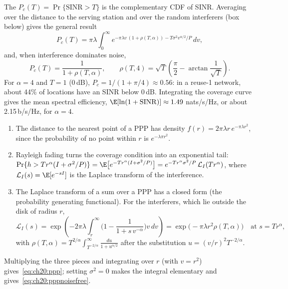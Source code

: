 The  $P_c(T)=\Pr\{\mathrm{SINR}>T\}$ is the complementary CDF of SINR. Averaging over
the distance to the serving station and over the random interferers (box below) gives the general result
\begin{equation}
P_c(T)=\pi\lambda\int_0^\infty e^{-\pi\lambda v\,(1+\rho(T,\alpha))-T\sigma^2v^{\alpha/2}/P}\,dv,
\label{eq:ch20:ppp}
\end{equation}
and, when interference dominates noise,
\begin{equation}
P_c(T)=\frac{1}{1+\rho(T,\alpha)},\qquad
\rho(T,4)=\sqrt T\left(\frac\pi2-\arctan\frac{1}{\sqrt T}\right).
\label{eq:ch20:pppnoisefree}
\end{equation}
For $\alpha=4$ and $T=1$ (0\,dB), $P_c=1/(1+\pi/4)\approx0.56$: in a reuse-1 network, about 44\% of locations have an
SINR below 0\,dB. Integrating the coverage curve gives the mean spectral efficiency, $\E[\ln(1+\mathrm{SINR})]\approx1.49$
nats/s/Hz, or about 2.15\,b/s/Hz, for $\alpha=4$.

\begin{deeper}
\begin{enumerate}
\item The distance to the nearest point of a PPP has density $f(r)=2\pi\lambda r\,e^{-\pi\lambda r^2}$, since the
probability of no point within $r$ is $e^{-\lambda\pi r^2}$.
\item Rayleigh fading turns the coverage condition into an exponential tail:
$\Pr\{h>Tr^{\alpha}(I+\sigma^2/P)\}=\E\big[e^{-Tr^{\alpha}(I+\sigma^2/P)}\big]=e^{-Tr^\alpha\sigma^2/P}\,\mathcal L_I(Tr^\alpha)$,
where $\mathcal L_I(s)=\E[e^{-sI}]$ is the Laplace transform of the interference.
\item The Laplace transform of a sum over a PPP has a closed form (the probability generating functional). For the
interferers, which lie outside the disk of radius $r$,
\begin{equation}
\mathcal L_I(s)=\exp\!\left(-2\pi\lambda\int_r^\infty\Big(1-\frac{1}{1+s\,v^{-\alpha}}\Big)v\,dv\right)
=\exp\!\big(-\pi\lambda r^2\rho(T,\alpha)\big)\quad\text{at } s=Tr^\alpha,
\end{equation}
with $\rho(T,\alpha)=T^{2/\alpha}\int_{T^{-2/\alpha}}^{\infty}\frac{du}{1+u^{\alpha/2}}$ after the substitution
$u=(v/r)^2T^{-2/\alpha}$.
\end{enumerate}
Multiplying the three pieces and integrating over $r$ (with $v=r^2$) gives~\eqref{eq:ch20:ppp}; setting $\sigma^2=0$
makes the integral elementary and gives~\eqref{eq:ch20:pppnoisefree}.
\end{deeper}

